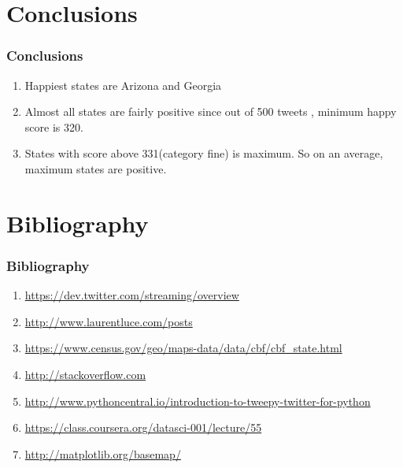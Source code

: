 \documentclass{beamer}
\begin{document}
\section{Conclusions}
\begin{frame}
\frametitle{Conclusions}
\begin{enumerate}
\item Happiest states are Arizona and Georgia
\item Almost all states are fairly positive since out of 500 tweets , minimum happy score is 320.
\item States with score above 331(category fine) is maximum. So on an average, maximum states are positive.
\end{enumerate}
\end{frame}

\section{Bibliography}
\begin{frame}
\frametitle{Bibliography}
\begin{enumerate}
\item \url{https://dev.twitter.com/streaming/overview}
\item \url{http://www.laurentluce.com/posts}
\item \url{https://www.census.gov/geo/maps-data/data/cbf/cbf_state.html}
\item \url{http://stackoverflow.com}
\item \url{http://www.pythoncentral.io/introduction-to-tweepy-twitter-for-python}
\item \url{https://class.coursera.org/datasci-001/lecture/55}
\item \url{http://matplotlib.org/basemap/}
\end{enumerate}
\end{frame}
\end{document}
